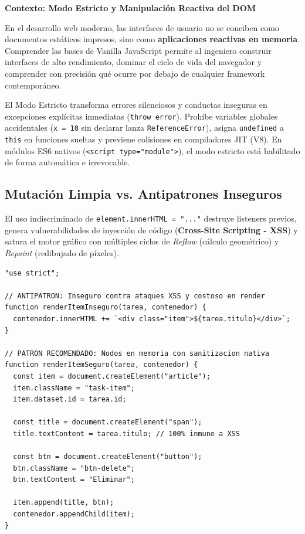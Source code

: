 \documentclass[10pt,letterpaper]{article}
\newcommand{\sectionBadge}[1]{%
  \refstepcounter{section}%
  \vspace{0.24cm}%
  \noindent%
  \colorbox{icesiBlue}{\color{white}\rule[-0.08cm]{0pt}{0.42cm}\hspace{0.16cm}\textbf{\normalsize \thesection}\hspace{0.16cm}}%
  \hspace{0.18cm}%
  {\fontsize{9.5}{12}\selectfont\textbf{\color{icesiDark}#1}}\\[-0.10cm]%
  \noindent{\color{icesiDark}\rule{\textwidth}{0.8pt}}\vspace{0.10cm}%
}
\begin{document}
\vspace{0.10cm}

\sectionBadge{Contexto: Modo Estricto y Manipulación Reactiva del DOM}

En el desarrollo web moderno, las interfaces de usuario no se conciben como documentos estáticos impresos, sino como \textbf{aplicaciones reactivas en memoria}. Comprender las bases de Vanilla JavaScript permite al ingeniero construir interfaces de alto rendimiento, dominar el ciclo de vida del navegador y comprender con precisión qué ocurre por debajo de cualquier framework contemporáneo.

\begin{tcolorbox}[colback=icesiOrange!10,colframe=icesiOrange,arc=3pt,title=\textbf{Directiva de Seguridad: Modo Estricto ("use strict")}]
\fontsize{7.5}{9.5}\selectfont
El Modo Estricto transforma errores silenciosos y conductas inseguras en excepciones explícitas inmediatas (\texttt{throw error}). Prohíbe variables globales accidentales (\texttt{x = 10} sin declarar lanza \texttt{ReferenceError}), asigna \texttt{undefined} a \texttt{this} en funciones sueltas y previene colisiones en compiladores JIT (V8). En módulos ES6 nativos (\texttt{<script type="module">}), el modo estricto está habilitado de forma automática e irrevocable.
\end{tcolorbox}

\subsection{Mutación Limpia vs. Antipatrones Inseguros}
El uso indiscriminado de \texttt{element.innerHTML = "..."} destruye listeners previos, genera vulnerabilidades de inyección de código (\textbf{Cross-Site Scripting - XSS}) y satura el motor gráfico con múltiples ciclos de \emph{Reflow} (cálculo geométrico) y \emph{Repaint} (redibujado de píxeles).

\begin{lstlisting}[style=jsstyle]
"use strict";

// ANTIPATRON: Inseguro contra ataques XSS y costoso en render
function renderItemInseguro(tarea, contenedor) {
  contenedor.innerHTML += `<div class="item">${tarea.titulo}</div>`;
}

// PATRON RECOMENDADO: Nodos en memoria con sanitizacion nativa
function renderItemSeguro(tarea, contenedor) {
  const item = document.createElement("article");
  item.className = "task-item";
  item.dataset.id = tarea.id;

  const title = document.createElement("span");
  title.textContent = tarea.titulo; // 100% inmune a XSS

  const btn = document.createElement("button");
  btn.className = "btn-delete";
  btn.textContent = "Eliminar";

  item.append(title, btn);
  contenedor.appendChild(item);
}
\end{lstlisting}
\end{document}
